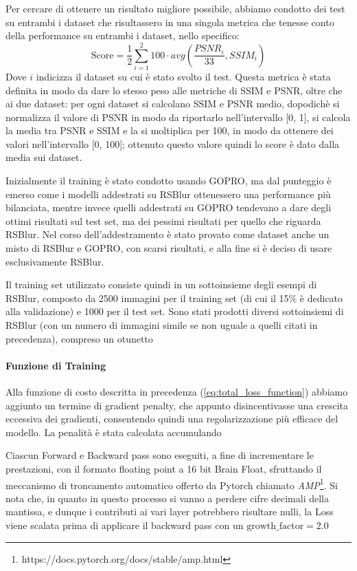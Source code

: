 \documentclass[a4paper,10pt,twocolumn]{article}
\begin{document}
Per cercare di ottenere un risultato migliore possibile, abbiamo condotto dei test su entrambi i dataset che risultassero in una singola metrica che tenesse conto della performance su entrambi
i dataset, nello specifico:
\[ \text{Score} = \frac{1}{2}\sum_{i=1}^2 100 \cdot avg(\frac{PSNR_i}{33}, SSIM_i)\]
Dove $i$ indicizza il dataset su cui è stato svolto il test. Questa metrica è stata definita in modo da dare lo stesso peso alle metriche di SSIM e PSNR, oltre che ai due dataset: per ogni dataset si calcolano SSIM e PSNR medio, dopodichè si normalizza
il valore di PSNR in modo da riportarlo nell'intervallo [0, 1], si calcola la media tra PSNR e SSIM e la si moltiplica per 100, in modo da ottenere dei valori nell'intervallo [0, 100]; ottenuto questo valore quindi lo score è dato dalla media sui dataset.

Inizialmente il training è stato condotto usando GOPRO, ma dal punteggio è emerso come i modelli addestrati su RSBlur ottenessero una performance più bilanciata, mentre invece quelli addestrati su GOPRO tendevano a dare degli ottimi risultati sul test set, ma dei pessimi 
risultati per quello che riguarda RSBlur. Nel corso dell'addestramento è stato provato come dataset anche un misto di RSBlur e GOPRO, con scarsi risultati, e alla fine si è deciso di usare esclusivamente RSBlur.

Il training set utilizzato consiste quindi in un sottoinsieme degli esempi di RSBlur, composto da 2500 immagini per il training set (di cui il 15\% è dedicato alla validazione) e 1000 per il test set. Sono stati prodotti diversi sottoinsiemi di RSBlur (con un numero di immagini
simile se non uguale a quelli citati in precedenza), compreso un
otunetto 

\paragraph{Funzione di Training}
Alla funzione di costo descritta in precedenza (\ref{eq:total_loss_function}) abbiamo aggiunto un termine di gradient penalty, che appunto disincentivasse una crescita
eccessiva dei gradienti, consentendo quindi una regolarizzazione più efficace del modello. La penalità è stata calcolata accumulando

Ciascun Forward e Backward pass sono eseguiti, a fine di incrementare le prestazioni, con il formato floating point a 16 bit Brain Float,
sfruttando il meccanismo di troncamento automatico offerto da Pytorch chiamato \textit{AMP}\footnote{https://docs.pytorch.org/docs/stable/amp.html}.
Si nota che, in quanto in questo processo si vanno a perdere cifre decimali della mantissa, e dunque i contributi ai vari layer potrebbero risultare nulli,
la Loss viene scalata prima di applicare il backward pass con un $\mathrm{growth\_factor} = 2.0$
\end{document}
